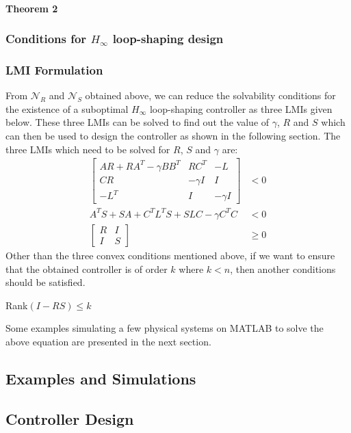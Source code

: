 \documentclass[a4paper,12pt]{article}
\begin{document}
	\paragraph{Theorem 2}
	
	 	
	 	\subsubsection{Conditions for $H_{\infty}$ loop-shaping design}
	 	\subsubsection{LMI Formulation}
	 	From $\mathscr{N}_{R}$ and $\mathscr{N}_{S}$ obtained above, we can reduce the solvability conditions for the existence of a suboptimal $H_{\infty}$ loop-shaping controller as three LMIs given below. These three LMIs can be solved to find out the value of $\gamma$, $R$ and $S$ which can then be used to design the controller as shown in the following section. The three LMIs which need to be solved for $R$, $S$ and $\gamma$ are:
	 	\begin{align}
	 	\begin{bmatrix}
	 	AR + RA^{T} - \gamma BB^{T} & RC^{T} & -L\\
	 	CR & -\gamma I & I \\
	 	-L^{T} & I & -\gamma I 
	 	\end{bmatrix} &< 0 \\
	 	A^{T}S + SA + C^{T}L^{T}S + SLC - \gamma C^{T}C &< 0 \\
	 	\begin{bmatrix}
	 	R & I \\
	 	I & S
	 	\end{bmatrix} &\geq 0
	 	\end{align}
	 	Other than the three convex conditions mentioned above, if we want to ensure that the obtained controller is of order $k$ where $k<n$, then another conditions should be satisfied.
	 	\begin{center} Rank$(I-RS) \leq k$ \end{center}
	 	Some examples simulating a few physical systems on MATLAB to solve the above equation are presented in the next section.
	 	\subsection{Examples and Simulations}
	 \subsection{Controller Design}
\end{document}
